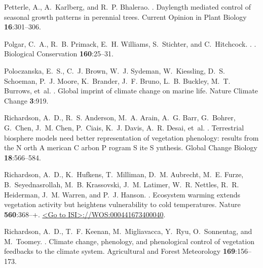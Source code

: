 \documentclass{article}
\begin{document}
\begin{thebibliography}{131}
Petterle, A., A.~Karlberg, and R.~P. Bhalerao.
.
\newblock Daylength mediated control of seasonal growth patterns in perennial
  trees.
\newblock Current Opinion in Plant Biology {\bf 16}:301--306.

Polgar, C.~A., R.~B. Primack, E.~H. Williams, S.~Stichter, and C.~Hitchcock.
.
.
\newblock Biological Conservation {\bf 160}:25--31.

Poloczanska, E.~S., C.~J. Brown, W.~J. Sydeman, W.~Kiessling, D.~S. Schoeman,
  P.~J. Moore, K.~Brander, J.~F. Bruno, L.~B. Buckley, M.~T. Burrows, et~al.
.
\newblock Global imprint of climate change on marine life.
\newblock Nature Climate Change {\bf 3}:919.

Richardson, A.~D., R.~S. Anderson, M.~A. Arain, A.~G. Barr, G.~Bohrer, G.~Chen,
  J.~M. Chen, P.~Ciais, K.~J. Davis, A.~R. Desai, et~al.
.
\newblock Terrestrial biosphere models need better representation of vegetation
  phenology: results from the N orth A merican C arbon P rogram S ite S
  ynthesis.
\newblock Global Change Biology {\bf 18}:566--584.

Richardson, A.~D., K.~Hufkens, T.~Milliman, D.~M. Aubrecht, M.~E. Furze,
  B.~Seyednasrollah, M.~B. Krassovski, J.~M. Latimer, W.~R. Nettles, R.~R.
  Heiderman, J.~M. Warren, and P.~J. Hanson.
.
\newblock Ecosystem warming extends vegetation activity but heightens
  vulnerability to cold temperatures.
\newblock Nature {\bf 560}:368--+.
\newblock \urlprefix\url{<Go to ISI>://WOS:000441673400040}.

Richardson, A.~D., T.~F. Keenan, M.~Migliavacca, Y.~Ryu, O.~Sonnentag, and
  M.~Toomey.
.
\newblock Climate change, phenology, and phenological control of vegetation
  feedbacks to the climate system.
\newblock Agricultural and Forest Meteorology {\bf 169}:156--173.


\end{thebibliography}
\end{document}
